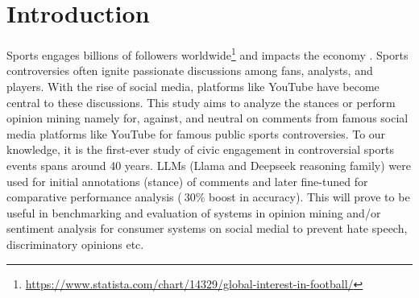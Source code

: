 \documentclass[sigconf, review]{acmart}
\begin{document}
\section{Introduction}


Sports engages billions of followers worldwide\footnote{\url{https://www.statista.com/chart/14329/global-interest-in-football/}} 
and impacts the economy \cite{sportseconomics20221}. Sports controversies often ignite passionate discussions among fans, analysts, and players. With the rise of social media, platforms like YouTube have become central to these discussions. This study aims to analyze the stances or perform opinion mining namely for, against, and neutral on comments from famous social media platforms like YouTube for famous public sports controversies.
To our knowledge, it is the first-ever study of civic engagement in controversial sports events spans around 40 years. LLMs (Llama and Deepseek reasoning family) were used for initial annotations (stance) of comments and later fine-tuned for comparative performance analysis ($~$30\% boost in accuracy).
This will prove to be useful in benchmarking and evaluation of systems in opinion mining and/or sentiment analysis for consumer systems on social medial to prevent hate speech, discriminatory opinions etc. 


\end{document}
